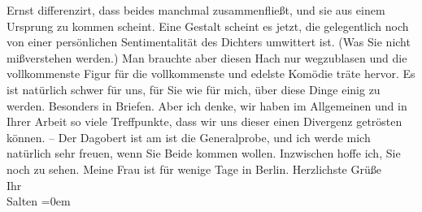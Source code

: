 \begin{ledgroupsized}[t]{13cm}
               Ernst differenzirt, dass beides manchmal zusammenfließt, und sie aus einem Ursprung
               zu kommen scheint. Eine Gestalt scheint es jetzt, die gelegentlich noch von einer
               persönlichen Sentimentalität des Dichters umwittert ist. (Was Sie nicht mißverstehen
               werden.) Man brauchte aber diesen Hach nur wegzublasen und die vollkommenste Figur
               für die vollkommenste und edelste Komödie träte hervor.\pend
           \pstart
           Es ist natürlich schwer für uns, für Sie wie für mich, über diese Dinge einig zu
               werden. Besonders in Briefen. Aber ich denke, wir haben im Allgemeinen und in Ihrer
               Arbeit so viele Treffpunkte, dass wir uns dieser einen Divergenz getrösten können. –
               Der Dagobert ist am \label{K_L03554-1v}\label{K_L03554-1h} ist die
               Generalprobe, und ich werde mich natürlich sehr freuen, wenn Sie Beide kommen wollen. Inzwischen hoffe ich,
               Sie noch zu sehen. Meine Frau ist für wenige Tage in Berlin.\pend
           \pstart
           Herzlichste Grüße {\\[\baselineskip]}Ihr {\\[\baselineskip]}\spacefill\mbox{Salten}\pend
           \leftskip=0em{}
         
         \endnumbering{}\end{ledgroupsized}  \newcommand{\dateiname}{L03554}\newcommand{\titel}{Felix Salten an Arthur Schnitzler, 22. 10. 1911}\newcommand{\editorInnen}{Martin Anton Müller und Laura Untner}
      